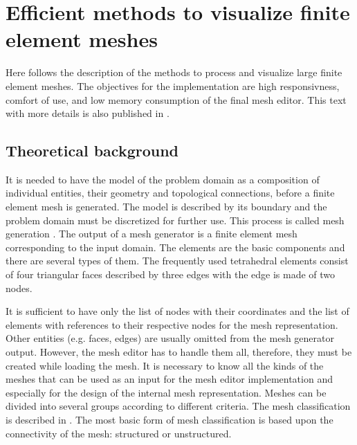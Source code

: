 \chapter{Efficient methods to visualize finite element meshes}
\label{appendix-mesh-visualization}

Here follows the description of the methods to process and visualize large finite element meshes. The objectives for the implementation are high responsivness, comfort of use, and low memory consumption of the final mesh editor. This text with more details is also published in \cite{Benes2015}.


\section{Theoretical background}

It is needed to have the model of the problem domain as a composition of individual entities, their geometry and topological connections, before a finite element mesh is generated. The model is described by its boundary and the problem domain must be discretized for further use. This process is called mesh generation \cite{XXX-2, XXX-3}. The output of a mesh generator is a finite element mesh corresponding to the input domain. The elements are the basic components and there are several types of them. The frequently used tetrahedral elements consist of four triangular faces described by three edges with the edge is made of two nodes.

It is sufficient to have only the list of nodes with their coordinates and the list of elements with references to their respective nodes for the mesh representation. Other entities (e.g. faces, edges) are usually omitted from the mesh generator output. However, the mesh editor has to handle them all, therefore, they must be created while loading the mesh. It is necessary to know all the kinds of the meshes that can be used as an input for the mesh editor implementation and especially for the design of the internal mesh representation. Meshes can be divided into several groups according to different criteria. The mesh classification is described in \cite{XXX-1}. The most basic form of mesh classification is based upon the connectivity of the mesh: structured or unstructured.

